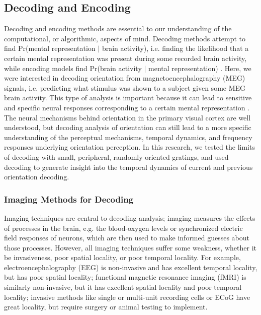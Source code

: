 \documentclass[../main.tex]{subfiles}
\begin{document}
\subsection*{Decoding and Encoding}
Decoding and encoding methods are essential to our understanding of the computational, or algorithmic, aspects of mind. Decoding methods attempt to find Pr(mental representation $|$ brain activity), i.e. finding the likelihood that a certain mental representation was present during some recorded brain activity, while encoding models find Pr(brain activity $|$ mental representation) \citep{king_2018}. Here, we were interested in decoding orientation from magnetoencephalography (MEG) signals, i.e. predicting what stimulus was shown to a subject given some MEG brain activity. This type of analysis is important because it can lead to sensitive and specific neural responses corresponding to a certain mental representation \citep{king_2018}. The neural mechanisms behind orientation in the primary visual cortex \citep{hubel_wiesel_1959} are well understood, but decoding analysis of orientation can still lead to a more specific understanding of the perceptual mechanisms, temporal dynamics, and frequency responses underlying orientation perception. In this research, we tested the limits of decoding with small, peripheral, randomly oriented gratings, and used decoding to generate insight into the temporal dynamics of current and previous orientation decoding.

\subsubsection*{Imaging Methods for Decoding}
Imaging techniques are central to decoding analysis; imaging measures the effects of processes in the brain, e.g. the blood-oxygen levels or synchronized electric field responses of neurons, which are then used to make informed guesses about those processes. However, all imaging techniques suffer some weakness, whether it be invasiveness, poor spatial locality, or poor temporal locality. For example, electroencephalography (EEG) is non-invasive and has excellent temporal locality, but has poor spatial locality; functional magnetic resonance imaging (fMRI) is similarly non-invasive, but it has excellent spatial locality and poor temporal locality; invasive methods like single or multi-unit recording cells or ECoG have great locality, but require surgery or animal testing to implement.
\end{document}
